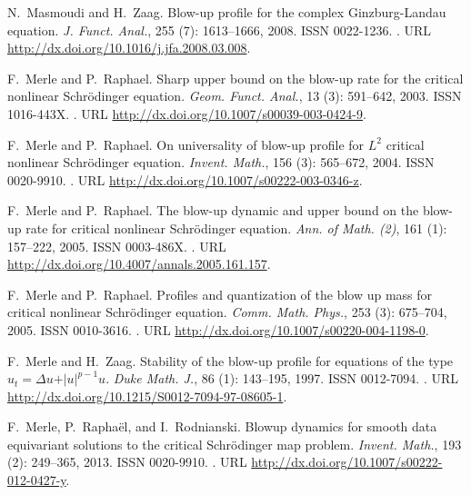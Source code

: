 \documentclass[11pt]{aims}
\theoremstyle{definition}
\numberwithin{equation}{section}
\begin{document}
\begin{thebibliography}{62}
N.~Masmoudi and H.~Zaag.
\newblock Blow-up profile for the complex {G}inzburg-{L}andau equation.
\newblock \emph{J. Funct. Anal.}, 255 (7): 1613--1666, 2008.
\newblock ISSN 0022-1236.
\newblock {}.
\newblock URL \url{http://dx.doi.org/10.1016/j.jfa.2008.03.008}.

F.~Merle and P.~Raphael.
\newblock Sharp upper bound on the blow-up rate for the critical nonlinear
  {S}chr\"odinger equation.
\newblock \emph{Geom. Funct. Anal.}, 13 (3): 591--642, 2003.
\newblock ISSN 1016-443X.
\newblock {}.
\newblock URL \url{http://dx.doi.org/10.1007/s00039-003-0424-9}.

F.~Merle and P.~Raphael.
\newblock On universality of blow-up profile for {$L^2$} critical nonlinear
  {S}chr\"odinger equation.
\newblock \emph{Invent. Math.}, 156 (3): 565--672, 2004.
\newblock ISSN 0020-9910.
\newblock {}.
\newblock URL \url{http://dx.doi.org/10.1007/s00222-003-0346-z}.

F.~Merle and P.~Raphael.
\newblock The blow-up dynamic and upper bound on the blow-up rate for critical
  nonlinear {S}chr\"odinger equation.
\newblock \emph{Ann. of Math. (2)}, 161 (1): 157--222,
  2005{}.
\newblock ISSN 0003-486X.
\newblock {}.
\newblock URL \url{http://dx.doi.org/10.4007/annals.2005.161.157}.

F.~Merle and P.~Raphael.
\newblock Profiles and quantization of the blow up mass for critical nonlinear
  {S}chr\"odinger equation.
\newblock \emph{Comm. Math. Phys.}, 253 (3): 675--704,
  2005{}.
\newblock ISSN 0010-3616.
\newblock {}.
\newblock URL \url{http://dx.doi.org/10.1007/s00220-004-1198-0}.

F.~Merle and H.~Zaag.
\newblock Stability of the blow-up profile for equations of the type
  {$u_t=\Delta u+\vert u\vert ^{p-1}u$}.
\newblock \emph{Duke Math. J.}, 86 (1): 143--195, 1997.
\newblock ISSN 0012-7094.
\newblock {}.
\newblock URL \url{http://dx.doi.org/10.1215/S0012-7094-97-08605-1}.

F.~Merle, P.~Rapha{\"e}l, and I.~Rodnianski.
\newblock Blowup dynamics for smooth data equivariant solutions to the critical
  {S}chr\"odinger map problem.
\newblock \emph{Invent. Math.}, 193 (2): 249--365, 2013.
\newblock ISSN 0020-9910.
\newblock {}.
\newblock URL \url{http://dx.doi.org/10.1007/s00222-012-0427-y}.


\end{thebibliography}
\end{document}
